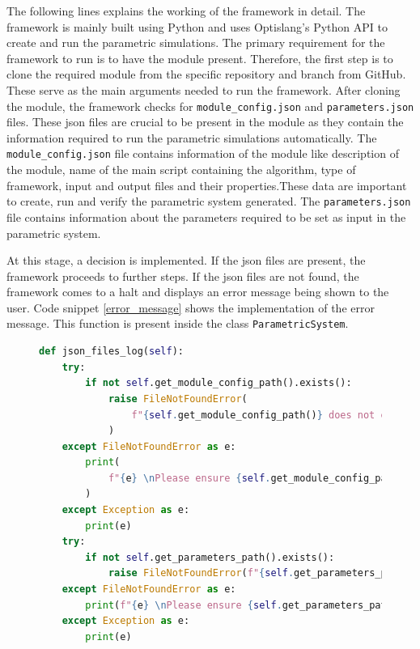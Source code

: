 The following lines explains the working of the framework in detail. The framework is mainly built using Python and uses Optislang's Python API to create and run the 
parametric simulations. The primary requirement for the framework to run is to have the module present. Therefore, the first step is to clone the required module
from the specific repository and branch from GitHub. These serve as the main arguments needed to run the framework. After cloning the module, the framework checks for 
\texttt{module\_config.json} and \texttt{parameters.json} files. These \acrshort{json} files are crucial to be present in the module as they contain the 
information required to run the parametric simulations automatically. The \texttt{module\_config.json} file contains information of 
the module like description of the module, name of the main script containing the algorithm, type of framework, input and output files and their properties.These data are important 
to create, run and verify the parametric system generated. The \texttt{parameters.json} file contains information about the parameters required to be set as input 
in the parametric system.

At this stage, a decision is implemented. If the \acrshort{json} files are present, the framework proceeds to further steps. If the \acrshort{json} files are not found, the framework
comes to a halt and displays an error message being shown to the user. Code snippet \ref{error_message} shows the implementation of the error message. This function is present
inside the class \texttt{ParametricSystem}.
\begin{figure}[!ht]
    \centering
    \renewcommand{\lstlistingname}{Code}
    \lstset{style=pythoncode}
    \begin{lstlisting}[language=python, caption= Function to verify existance of \acrshort{json} files, label={error_message}]
def json_files_log(self):
    try:
        if not self.get_module_config_path().exists():
            raise FileNotFoundError(
                f"{self.get_module_config_path()} does not exist"
            )
    except FileNotFoundError as e:
        print(
            f"{e} \nPlease ensure {self.get_module_config_path()} exists and re-run"
        )
    except Exception as e:
        print(e)
    try:
        if not self.get_parameters_path().exists():
            raise FileNotFoundError(f"{self.get_parameters_path()} does not exist")
    except FileNotFoundError as e:
        print(f"{e} \nPlease ensure {self.get_parameters_path} exists and re-run")
    except Exception as e:
        print(e)
\end{lstlisting}
\end{figure}

